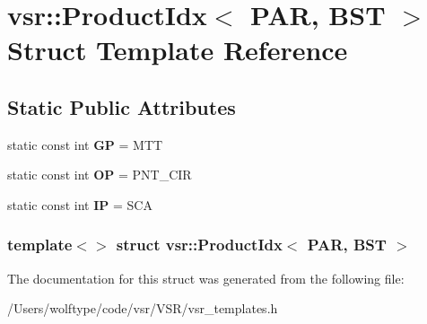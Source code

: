\hypertarget{structvsr_1_1_product_idx_3_01_p_a_r_00_01_b_s_t_01_4}{\section{vsr\-:\-:Product\-Idx$<$ P\-A\-R, B\-S\-T $>$ Struct Template Reference}
\label{structvsr_1_1_product_idx_3_01_p_a_r_00_01_b_s_t_01_4}
}
\subsection*{Static Public Attributes}
\begin{DoxyCompactItemize}
\item 
\hypertarget{structvsr_1_1_product_idx_3_01_p_a_r_00_01_b_s_t_01_4_abe8f0242b851f275dcdd9177041e73f0}{static const int {\bfseries G\-P} = M\-T\-T}\label{structvsr_1_1_product_idx_3_01_p_a_r_00_01_b_s_t_01_4_abe8f0242b851f275dcdd9177041e73f0}

\item 
\hypertarget{structvsr_1_1_product_idx_3_01_p_a_r_00_01_b_s_t_01_4_a418fdb32c58b73d405cf018626a5888c}{static const int {\bfseries O\-P} = P\-N\-T\-\_\-\-C\-I\-R}\label{structvsr_1_1_product_idx_3_01_p_a_r_00_01_b_s_t_01_4_a418fdb32c58b73d405cf018626a5888c}

\item 
\hypertarget{structvsr_1_1_product_idx_3_01_p_a_r_00_01_b_s_t_01_4_ab737e2dfb3e88628a6a0dcdd7b5bfa7b}{static const int {\bfseries I\-P} = S\-C\-A}\label{structvsr_1_1_product_idx_3_01_p_a_r_00_01_b_s_t_01_4_ab737e2dfb3e88628a6a0dcdd7b5bfa7b}

\end{DoxyCompactItemize}
\subsubsection*{template$<$$>$ struct vsr\-::\-Product\-Idx$<$ P\-A\-R, B\-S\-T $>$}



The documentation for this struct was generated from the following file\-:\begin{DoxyCompactItemize}
\item 
/\-Users/wolftype/code/vsr/\-V\-S\-R/vsr\-\_\-templates.\-h\end{DoxyCompactItemize}
